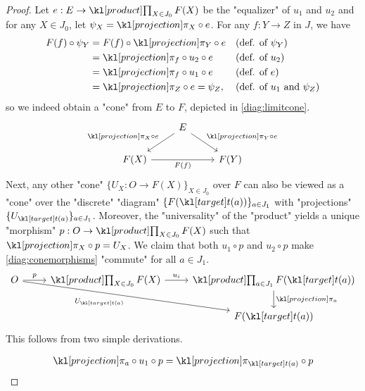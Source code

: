 \documentclass[main.tex]{subfiles}
\begin{document}
\begin{proof}
    Let $e:E\rightarrow \Product_{X\in J_0} F(X)$ be the "equalizer" of $u_1$ and $u_2$ and for any $X \in J_0$, let $\psi_X = \projection_X \circ e$. For any $f: Y \rightarrow Z$ in $J$, we have 
    \begin{align*}
        F(f) \circ \psi_Y &= F(f) \circ \projection_Y \circ e &&\mbox{(def. of $\psi_Y$)}\\ 
        &= \projection_f \circ u_2 \circ e &&\mbox{(def. of $u_2$)}\\ 
        &= \projection_f \circ u_1 \circ e &&\mbox{(def. of $e$)}\\
        &= \projection_Z \circ e = \psi_Z, &&\mbox{(def. of $u_1$ and $\psi_Z$)}
    \end{align*}
    so we indeed obtain a "cone" from $E$ to $F$, depicted in \eqref{diag:limitcone}.
    \begin{equation}\label{diag:limitcone}
        \begin{tikzcd}
            & E \arrow[ld, "\projection_X \circ e"'] \arrow[rd, "\projection_Y \circ e"] &      \\
            F(X) \arrow[rr, "F(f)"'] & & F(Y)
        \end{tikzcd}
    \end{equation}
    Next, any other "cone" $\{U_X: O \rightarrow F(X)\}_{X \in J_0}$ over $F$ can also be viewed as a "cone" over the "discrete" "diagram" $\{F(\target(a))\}_{a \in J_1}$ with "projections" $\{U_{\target(a)}\}_{a \in J_1}$. Moreover, the "universality" of the "product" yields a unique "morphism" $p: O\rightarrow \Product_{X \in J_0} F(X)$ such that $\projection_X \circ p = U_X$. We claim that both $u_1 \circ p$ and $u_2 \circ p$ make \eqref{diag:conemorphisms} "commute" for all $a \in J_1$.
    \begin{equation}\label{diag:conemorphisms}
        \begin{tikzcd}
            O \arrow[r, "p"] \arrow[rrd, "U_{\target(a)}"'] &\Product_{X \in J_0} F(X) \arrow[r, "u_i"] & \Product_{a \in J_1} F(\target(a)) \arrow[d, "\projection_a"] \\
             & & F(\target(a))
            \end{tikzcd}
    \end{equation}
    This follows from two simple derivations.\\
    \begin{minipage}{0.49\textwidth}
    \begin{align*}
        \projection_a \circ u_1 \circ p &= \projection_{\target(a)} \circ p\\

\end{align*}
\end{minipage}
\end{proof}
\end{document}
